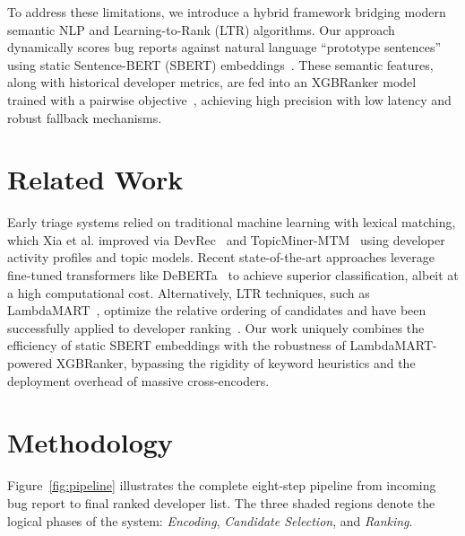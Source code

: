\documentclass[sigconf,review,anonymous]{acmart}
\begin{document}
To address these limitations, we introduce a hybrid framework bridging modern semantic NLP and Learning-to-Rank (LTR) algorithms. Our approach dynamically scores bug reports against natural language ``prototype sentences'' using static Sentence-BERT (SBERT) embeddings~\cite{reimers2019sentencetransformers}. These semantic features, along with historical developer metrics, are fed into an XGBRanker model~\cite{chen2016xgboost} trained with a pairwise objective~\cite{liu2009ltr}, achieving high precision with low latency and robust fallback mechanisms.

\section{Related Work}

Early triage systems relied on traditional machine learning with lexical matching, which Xia et al. improved via DevRec~\cite{xia2013devsim} and TopicMiner-MTM~\cite{xia2017topicminer} using developer activity profiles and topic models. Recent state-of-the-art approaches leverage fine-tuned transformers like DeBERTa~\cite{dipongkor2023transformer} to achieve superior classification, albeit at a high computational cost. Alternatively, LTR techniques, such as LambdaMART~\cite{burges2010lambdamart}, optimize the relative ordering of candidates and have been successfully applied to developer ranking~\cite{mkaouer2020ltrdevs}. Our work uniquely combines the efficiency of static SBERT embeddings with the robustness of LambdaMART-powered XGBRanker, bypassing the rigidity of keyword heuristics and the deployment overhead of massive cross-encoders.

\section{Methodology}

Figure~\ref{fig:pipeline} illustrates the complete eight-step pipeline from
incoming bug report to final ranked developer list.
The three shaded regions denote the logical phases of the system:
\emph{Encoding}, \emph{Candidate Selection}, and \emph{Ranking}.
\end{document}
